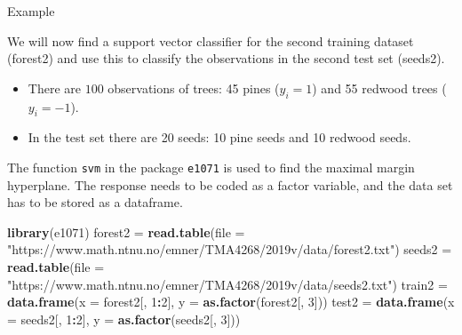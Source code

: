 \documentclass[ignorenonframetext,]{beamer}
\newenvironment{Shaded}{\begin{snugshade}}{\end{snugshade}}
\newcommand{\KeywordTok}[1]{\textcolor[rgb]{0.13,0.29,0.53}{\textbf{#1}}}
\newcommand{\DataTypeTok}[1]{\textcolor[rgb]{0.13,0.29,0.53}{#1}}
\newcommand{\DecValTok}[1]{\textcolor[rgb]{0.00,0.00,0.81}{#1}}
\newcommand{\StringTok}[1]{\textcolor[rgb]{0.31,0.60,0.02}{#1}}
\newcommand{\OperatorTok}[1]{\textcolor[rgb]{0.81,0.36,0.00}{\textbf{#1}}}
\newcommand{\NormalTok}[1]{#1}
\providecommand{\tightlist}{%
  \setlength{\itemsep}{0pt}\setlength{\parskip}{0pt}}
\begin{document}
\begin{frame}[fragile]

\begin{block}{Example}

We will now find a support vector classifier for the second training
dataset (forest2) and use this to classify the observations in the
second test set (seeds2).

\begin{itemize}
\tightlist
\item
  There are \(100\) observations of trees: 45 pines (\(y_i=1\)) and 55
  redwood trees (\(y_i=-1\)).
\item
  In the test set there are 20 seeds: 10 pine seeds and 10 redwood
  seeds.
\end{itemize}

The function \texttt{svm} in the package \texttt{e1071} is used to find
the maximal margin hyperplane. The response needs to be coded as a
factor variable, and the data set has to be stored as a dataframe.

\footnotesize

\begin{Shaded}
\begin{Highlighting}[]
\KeywordTok{library}\NormalTok{(e1071)}
\NormalTok{forest2 =}\StringTok{ }\KeywordTok{read.table}\NormalTok{(}\DataTypeTok{file =} \StringTok{"https://www.math.ntnu.no/emner/TMA4268/2019v/data/forest2.txt"}\NormalTok{)}
\NormalTok{seeds2 =}\StringTok{ }\KeywordTok{read.table}\NormalTok{(}\DataTypeTok{file =} \StringTok{"https://www.math.ntnu.no/emner/TMA4268/2019v/data/seeds2.txt"}\NormalTok{)}
\NormalTok{train2 =}\StringTok{ }\KeywordTok{data.frame}\NormalTok{(}\DataTypeTok{x =}\NormalTok{ forest2[, }\DecValTok{1}\OperatorTok{:}\DecValTok{2}\NormalTok{], }\DataTypeTok{y =} \KeywordTok{as.factor}\NormalTok{(forest2[, }\DecValTok{3}\NormalTok{]))}
\NormalTok{test2 =}\StringTok{ }\KeywordTok{data.frame}\NormalTok{(}\DataTypeTok{x =}\NormalTok{ seeds2[, }\DecValTok{1}\OperatorTok{:}\DecValTok{2}\NormalTok{], }\DataTypeTok{y =} \KeywordTok{as.factor}\NormalTok{(seeds2[, }\DecValTok{3}\NormalTok{]))}
\end{Highlighting}
\end{Shaded}

\normalsize

\end{block}

\end{frame}
\end{document}
